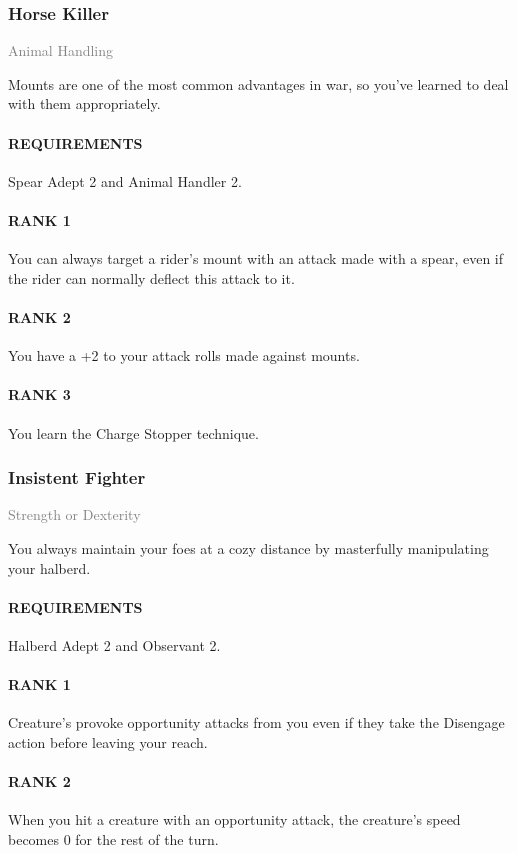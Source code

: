 \subsubsection{Horse Killer} \label{feat::horsekiller}
\small{\textcolor{gray}{Animal Handling}}

\normalsize
Mounts are one of the most common advantages in war, so you've learned to deal with them appropriately.
\paragraph{REQUIREMENTS} Spear Adept 2 and Animal Handler 2.
\paragraph{RANK 1} You can always target a rider's mount with an attack made with a spear, even if the rider can normally deflect this attack to it.
\paragraph{RANK 2} You have a +2 to your attack rolls made against mounts.
\paragraph{RANK 3} You learn the Charge Stopper technique.

\subsubsection{Insistent Fighter} \label{feat::insistentfighter}
\small{\textcolor{gray}{Strength or Dexterity}}

\normalsize
You always maintain your foes at a cozy distance by masterfully manipulating your halberd.
\paragraph{REQUIREMENTS} Halberd Adept 2 and Observant 2.
\paragraph{RANK 1} Creature's provoke opportunity attacks from you even if they take the Disengage action before leaving your reach.
\paragraph{RANK 2} When you hit a creature with an opportunity attack, the creature's speed becomes 0 for the rest of the turn.
